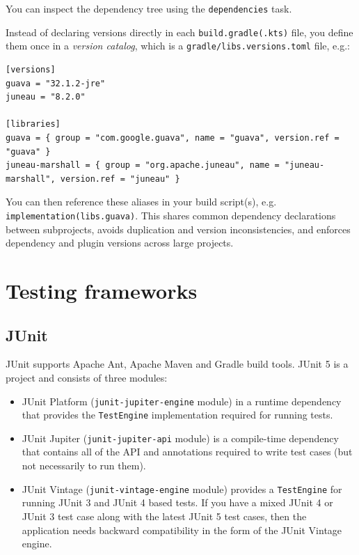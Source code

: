\documentclass[table, xcdraw]{article}%
\begin{document}
You can inspect the dependency tree using the \texttt{dependencies} task.

Instead of declaring versions directly in each \texttt{build.gradle(.kts)} file, you define them once in a \emph{version catalog}, which is a \texttt{gradle/libs.versions.toml} file, e.g.:

\begin{verbatim}
[versions]
guava = "32.1.2-jre"
juneau = "8.2.0"

[libraries]
guava = { group = "com.google.guava", name = "guava", version.ref = "guava" }
juneau-marshall = { group = "org.apache.juneau", name = "juneau-marshall", version.ref = "juneau" }
\end{verbatim}

You can then reference these aliases in your build script(s), e.g. \texttt{implementation(libs.guava)}. This shares common dependency declarations between subprojects, avoids duplication and version inconsistencies, and enforces dependency and plugin versions across large projects.


\section{Testing frameworks}

\subsection{JUnit}

JUnit supports Apache Ant, Apache Maven and Gradle build tools. JUnit 5 is a project and consists of three modules:

\begin{itemize}
    \item JUnit Platform (\texttt{junit-jupiter-engine} module) in a runtime dependency that provides the \texttt{TestEngine} implementation required for running tests.
    \item JUnit Jupiter (\texttt{junit-jupiter-api} module) is a compile-time dependency that contains all of the API and annotations required to write test cases (but not necessarily to run them).
    \item JUnit Vintage (\texttt{junit-vintage-engine} module) provides a \texttt{TestEngine} for running JUnit 3 and JUnit 4 based tests. If you have a mixed JUnit 4 or JUnit 3 test case along with the latest JUnit 5 test cases, then the application needs backward compatibility in the form of the JUnit Vintage engine.
\end{itemize}
\end{document}
